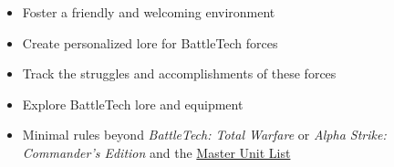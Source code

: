 \begin{itemize}

\item Foster a friendly and welcoming environment

\item Create personalized lore for BattleTech forces

\item Track the struggles and accomplishments of these forces

\item Explore BattleTech lore and equipment

\item Minimal rules beyond \emph{BattleTech: Total Warfare} or \emph{Alpha Strike: Commander's Edition} and the \href{http://www.masterunitlist.info}{Master Unit List}

\end{itemize}
